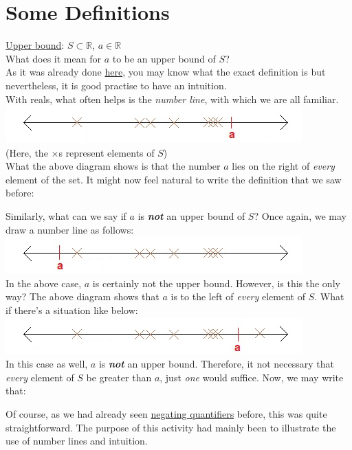 \section{Some Definitions}\label{sec:bounds}
\underline{Upper bound}: $S \subset \mathbb{R}$, $a \in \mathbb{R}$\\
What does it mean for $a$ to be an upper bound of $S$?\\
As it was already done \hyperref[sec:ub]{here}, you may know what the exact definition is but nevertheless, it is good practise to have an intuition.\\
With reals, what often helps is the \textit{number line}, with which we are all familiar.\\
\includegraphics[width=18 cm]{images/upperbound.jpg}\\
\phantom{ } \hfill (Here, the $\times$s represent elements of $S$)\\
What the above diagram shows is that the number $a$ lies on the right of \textit{every} element of the set. It might now feel natural to write the definition that we saw before:
\begin{center}
\end{center}
Similarly, what can we say if $a$ is \textbf{\textit{not}} an upper bound of $S$? Once again, we may draw a number line as follows:\\
\includegraphics[width=18 cm]{images/lowerboundfalse.jpg}\\
In the above case, $a$ is certainly not the upper bound. However, is this the only way? The above diagram shows that $a$ is to the left of \textit{every} element of $S$. What if there's a situation like below:\\
\includegraphics[width=18 cm]{images/lowerbound.jpg}\\
In this case as well, $a$ is \textit{\textbf{not}} an upper bound. Therefore, it not necessary that \textit{every} element of $S$ be greater than $a$, just \textit{one} would suffice. Now, we may write that:
\begin{center}
\end{center}
Of course, as we had already seen \hyperref[sec:negquant]{negating quantifiers} before, this was quite straightforward. The purpose of this activity had mainly been to illustrate the use of number lines and intuition.

